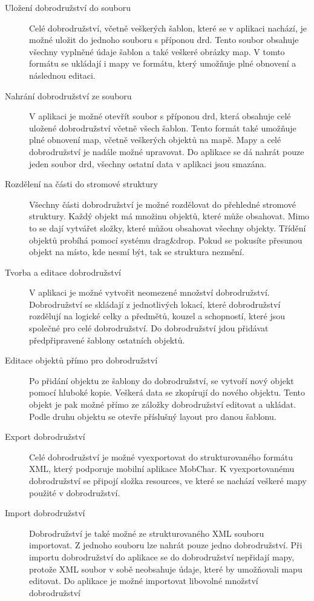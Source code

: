 \documentclass[thesis=B,czech]{resources/FITthesis}[2012/06/26]
\begin{document}
	\begin{description}
		\item[Uložení dobrodružství do souboru]
Celé dobrodružství, včetně veškerých šablon, které se v aplikaci nachází, je možné uložit do jednoho souboru s příponou drd. Tento soubor obsahuje všechny vyplněné údaje šablon a také veškeré obrázky map. V tomto formátu se ukládají i mapy ve formátu, který umožňuje plné obnovení a následnou editaci. 

		\item[Nahrání dobrodružství ze souboru]
V aplikaci je možné otevřít soubor s příponou drd, která obsahuje celé uložené dobrodružství včetně všech šablon. Tento formát také umožňuje plné obnovení map, včetně veškerých objektů na mapě. Mapy a celé dobrodružství je nadále možné upravovat. Do aplikace se dá nahrát pouze jeden soubor drd, všechny ostatní data v aplikaci jsou smazána.
 
		\item[Rozdělení na části do stromové struktury]
		Všechny části dobrodružství je možné rozdělovat do přehledné stromové struktury. Každý objekt má množinu objektů, které může obsahovat. Mimo to se dají vytvářet složky, které můžou obsahovat všechny objekty. Třídění objektů probíhá pomocí systému drag\&drop. Pokud se pokusíte přesunou objekt na místo, kde nesmí být, tak se struktura nezmění. 
		
		\item[Tvorba a editace dobrodružství]
V aplikaci je možné vytvořit neomezené množství dobrodružství. Dobrodružství se skládají z jednotlivých lokací, které dobrodružství rozdělují na logické celky a  předmětů, kouzel a schopností, které jsou společné pro celé dobrodružství. Do dobrodružství jdou přidávat předpřipravené šablony ostatních objektů. 

		\item[Editace objektů přímo pro dobrodružství]
Po přidání objektu ze šablony do dobrodružství, se vytvoří nový objekt pomocí hluboké kopie. Veškerá data se zkopírují do nového objektu. Tento objekt je pak možné přímo ze záložky dobrodružství editovat a ukládat. Podle druhu objektu se otevře příslušný layout pro danou šablonu.

		\item[Export dobrodružství]
		Celé dobrodružství je možné vyexportovat do strukturovaného formátu XML, který podporuje mobilní aplikace MobChar. K vyexportovanému dobrodružství se připojí složka resources, ve které se nachází veškeré mapy použité v dobrodružství. 
		
		\item[Import dobrodružství]
		Dobrodružství je také možné ze strukturovaného XML souboru importovat. Z jednoho souboru lze nahrát pouze jedno dobrodružství. Při importu dobrodružství do aplikace se do dobrodružství nepřidají mapy, protože XML soubor v sobě neobsahuje údaje, které by umožňovali mapu editovat. Do aplikace je možné importovat libovolné množství dobrodružství
	\end{description}
	
\end{document}
